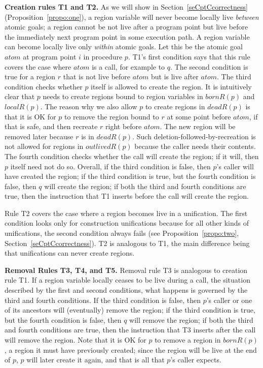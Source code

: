\documentclass{tlp}
\newcommand{\bornR}[1]{\ensuremath{{bornR}(#1)}}
\newcommand{\deadR}[1]{\ensuremath{{deadR}(#1)}}
\newcommand{\localR}[1]{\ensuremath{{localR}(#1)}}
\newcommand{\outlivedR}[1]{\ensuremath{{outlivedR}(#1)}}
\begin{document}
\noindent\textbf{Creation rules T1 and T2.}
As we will show in Section~\ref{seCptCcorrectness}
(Proposition~\ref{propo:one}),
a region variable will never become locally live \emph{between} atomic goals;
a region cannot be not live after a program point
but live before the immediately next program point in some execution path.
A region variable can become locally live only \emph{within} atomic goals.
Let this be the atomic goal ${atom}$ at program point $i$ in procedure $p$.
T1's first condition says that this rule covers the case
where ${atom}$ is a call, for example to $q$.
The second condition is true for a region $r$
that is not live before ${atom}$ but is live after ${atom}$.
The third condition checks whether $p$ itself is allowed to create the region.
It is intuitively clear that $p$ needs to create regions
bound to region variables in \bornR{p} and \localR{p}.
The reason why we also allow $p$ to create regions in $\deadR{p}$
is that it is OK for $p$ to remove the region bound to $r$
at some point before ${atom}$, if that is safe,
and then recreate $r$ right before ${atom}$.
The new region will be removed later because $r$ is in $\deadR{p}$.
Such deletion-followed-by-recreation
is not allowed for regions in $\outlivedR{p}$
because the caller needs their contents.
The fourth condition checks whether the call will create the region;
if it will, then $p$ itself need not do so.
Overall, if the third condition is false,
then $p$'s caller will have created the region;
if the third condition is true,
but the fourth condition is false,
then $q$ will create the region;
if both the third and fourth conditions are true,
then the instruction that T1 inserts before the call will create the region.

Rule T2 covers the case where a region becomes live in a unification.
The first condition looks only for construction unifications
because for all other kinds of unifications,
the second condition always fails
(see Proposition~\ref{propo:two}, Section~\ref{seCptCcorrectness}).
T2 is analogous to T1, the main difference being that
unifications can never create regions.

\noindent\textbf{Removal Rules T3, T4, and T5.}
Removal rule T3 is analogous to creation rule T1.
If a region variable locally ceases to be live during a call,
the situation described by the first and second conditions,
what happens is governed by the third and fourth conditions.
If the third condition is false,
then $p$'s caller or one of its ancestors will (eventually) remove the region;
if the third condition is true,
but the fourth condition is false,
then $q$ will remove the region;
if both the third and fourth conditions are true,
then the instruction that T3 inserts after the call will remove the region.
Note that it is OK for $p$ to remove a region in $\bornR{p}$,
a region it must have previously created;
since the region will be live at the end of $p$,
$p$ will later create it again,
and that is all that $p$'s caller expects.
\end{document}
